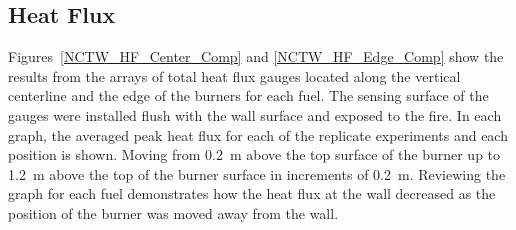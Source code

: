 \documentclass[twoside]{uocthesis}
\begin{document}
{\subsection{Heat Flux}

Figures~\ref{NCTW_HF_Center_Comp} and \ref{NCTW_HF_Edge_Comp} show the results from the arrays of total heat flux gauges located along the vertical centerline and the edge of the burners for each fuel.  The sensing surface of the gauges were installed flush with the wall surface and exposed to the fire. In each graph, the averaged peak heat flux for each of the replicate experiments and each position is shown.  Moving from 0.2~m above the top surface of the burner up to 1.2~m above the top of the burner surface in increments of 0.2~m.  Reviewing the graph for each fuel demonstrates how the heat flux at the wall decreased as the position of the burner was moved away from the wall.  

}
\end{document}
